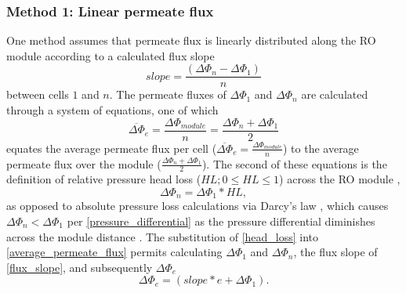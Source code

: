 \subsubsection{Method 1: Linear permeate flux}
One method assumes that permeate flux is linearly distributed along the RO module according to a calculated flux slope
\begin{equation} \label{flux_slope}
    slope = \frac{(\Delta \Phi_{n}-\Delta \Phi_{1})}{n}
\end{equation}
between cells $1$ and $n$. The permeate fluxes of $\Delta \Phi_{1}$ and $\Delta \Phi_{n}$ are calculated through a system of equations, one of which 
\begin{equation} \label{average_permeate_flux}
     \overbar{\Delta \Phi}_{e} = \frac{\Delta \Phi_{module}}{n} = \frac{\Delta \Phi_{n} + \Delta \Phi_{1}}{2}
\end{equation}
equates the average permeate flux per cell ($\overbar{\Delta \Phi}_{e} = \frac{\Delta \Phi_{module}}{n}$) to the average permeate flux over the module ($\frac{\Delta \Phi_{n} + \Delta \Phi_{1}}{2}$). The second of these equations is the definition of relative pressure head loss \cite{Srivathsan2014ReverseUnsteadiness,Gu2020ModelingNetworks} ($HL ; 0\le HL\le 1$) across the RO module \cite{Fraidenraich2009ReverseExperiment},
\begin{equation} \label{head_loss}
     \Delta \Phi_{n}= \Delta \Phi_{1}*HL,
\end{equation}
as opposed to absolute pressure loss calculations via Darcy's law \cite{Strubbe2018CalibrationFull-Scale}, which causes $\Delta \Phi_{n}<\Delta \Phi_{1}$ per \cref{pressure_differential} as the pressure differential diminishes across the module distance \cite{Li2016Three-dimensionalChannel}. The substitution of \cref{head_loss} into \cref{average_permeate_flux} permits calculating $\Delta \Phi_{1}$ and  $\Delta \Phi_{n}$, the flux slope of \cref{flux_slope}, and subsequently $\Delta \Phi_{e}$
\begin{equation} \label{intermediary_permeate_flux}
    \Delta \Phi_{e} = (slope*e+\Delta \Phi_{1}).
\end{equation}

